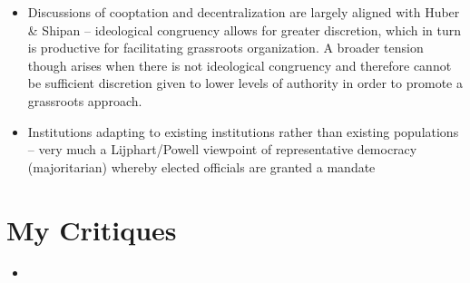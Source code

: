 \documentclass[12pt]{article}
\begin{document}
\begin{itemize}
    \item Discussions of cooptation and decentralization are largely aligned with Huber \& Shipan -- ideological congruency allows for greater discretion, which in turn is productive for facilitating grassroots organization. A broader tension though arises when there is not ideological congruency and therefore cannot be sufficient discretion given to lower levels of authority in order to promote a grassroots approach.
    \item Institutions adapting to existing institutions rather than existing populations -- very much a Lijphart/Powell viewpoint of representative democracy (majoritarian) whereby elected officials are granted a mandate
\end{itemize}


\section{My Critiques}

\begin{itemize}
    \item
\end{itemize}
\end{document}
